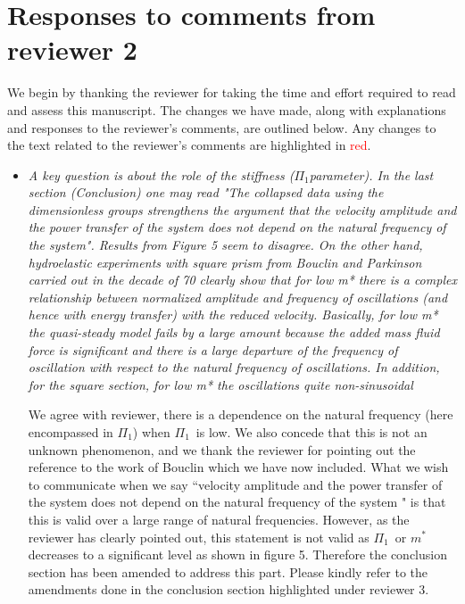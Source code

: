 \documentclass[]{article}
\newcommand{\mstar}{\ensuremath{m^{*}}}
\newcommand{\massstiff}{\ensuremath{\Pi_1}}
\begin{document}
\section*{Responses to comments from reviewer 2}

We begin by thanking the reviewer for taking the time and effort
required to read and assess this manuscript. The changes we have made, along with explanations and
responses to the reviewer's comments, are outlined below. Any changes to the text related to the reviewer's comments are highlighted in
\textcolor{red}{red}.

\begin{itemize}
	\item \emph{ A key question is about the role of the stiffness (\massstiff parameter). In the last section (Conclusion) one may read "The collapsed data using the dimensionless groups strengthens the argument that the velocity amplitude and the power transfer of the system does not depend on the natural frequency of the system". Results from Figure 5 seem to disagree. On the other hand, hydroelastic experiments with square prism from Bouclin and Parkinson carried out in the decade of 70  clearly show that for low m* there is a complex relationship between normalized amplitude and frequency of oscillations (and hence with energy transfer) with the reduced velocity. Basically, for low m* the quasi-steady model fails by a large amount because the added mass fluid force is significant and there is a large departure of the frequency of oscillation with respect to the natural frequency of oscillations. In addition, for the square section, for low m* the oscillations quite non-sinusoidal}
	
We agree with reviewer, there is a dependence on the natural frequency (here encompassed in \massstiff) when \massstiff\ is low. We also concede that this is not an unknown phenomenon, and we thank the reviewer for pointing out the reference to the work of Bouclin which we have now included. What we wish to communicate when we say ``velocity amplitude and the power transfer of the system does not depend on the natural frequency of the system " is that this is valid over a large range of natural frequencies. However, as the reviewer has clearly pointed out, this statement is not valid as \massstiff \ or \mstar decreases to a significant level as shown in figure 5. Therefore the conclusion section has been amended to address this part. Please kindly refer to the amendments done in the conclusion section highlighted under reviewer 3.


\end{itemize}
\end{document}
